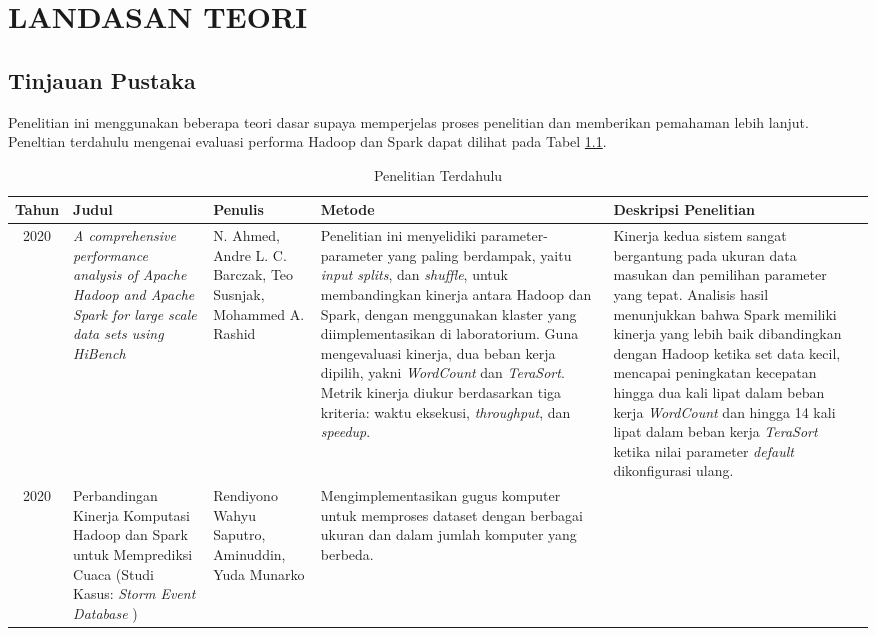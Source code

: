 \chapter{LANDASAN TEORI}

\section{Tinjauan Pustaka}
Penelitian ini menggunakan beberapa teori dasar supaya memperjelas proses penelitian dan memberikan pemahaman lebih lanjut. Peneltian terdahulu mengenai evaluasi performa Hadoop dan Spark dapat dilihat pada Tabel \ref{table:penelitian-dulu}.

\begin{table}
\caption{Penelitian Terdahulu}
\label{table:penelitian-dulu}
\scriptsize
\begin{tabularx}{\textwidth}{c*{5}{>{\raggedright\arraybackslash}X}}
\toprule
\textbf{Tahun} & \textbf{Judul} & \textbf{Penulis} & \textbf{Metode} 
  & \textbf{Deskripsi Penelitian} \\
\midrule
2020 & \textit{A comprehensive performance analysis of Apache Hadoop and Apache Spark for large scale data sets using HiBench \cite{ahmedComprehensivePerformanceAnalysis2020}} 
  & N. Ahmed, Andre L. C. Barczak, Teo Susnjak, Mohammed A. Rashid
  & Penelitian ini menyelidiki parameter-parameter yang paling berdampak, yaitu \textit{input splits}, dan \textit{shuffle}, untuk membandingkan kinerja antara Hadoop dan Spark, dengan menggunakan klaster yang diimplementasikan di laboratorium. Guna mengevaluasi kinerja, dua beban kerja dipilih, yakni \textit{WordCount} dan  \textit{TeraSort}. Metrik kinerja diukur berdasarkan tiga kriteria: waktu eksekusi, \textit{throughput}, dan \textit{speedup}. 
  & Kinerja kedua sistem sangat bergantung pada ukuran data masukan dan pemilihan parameter yang tepat. Analisis hasil menunjukkan bahwa Spark memiliki kinerja yang lebih baik dibandingkan dengan Hadoop ketika set data kecil, mencapai peningkatan kecepatan hingga dua kali lipat dalam beban kerja \textit{WordCount} dan hingga 14 kali lipat dalam beban kerja \textit{TeraSort} ketika nilai parameter \textit{default} dikonfigurasi ulang. \\
2020 & Perbandingan Kinerja Komputasi Hadoop dan Spark untuk Memprediksi Cuaca (Studi Kasus: \textit{Storm Event Database} \cite{saputroPerbandinganKinerjaKomputasi2020}) 
  & Rendiyono Wahyu Saputro, Aminuddin, Yuda Munarko 
  & Mengimplementasikan gugus komputer untuk memproses dataset dengan berbagai ukuran dan dalam jumlah komputer yang berbeda. 

\end{tabularx}
\end{table}
